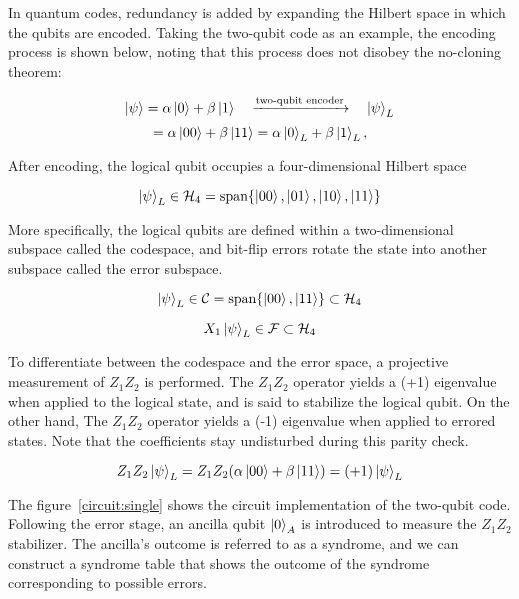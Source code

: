 In quantum codes, redundancy is added by expanding the Hilbert space in which the qubits are encoded. Taking the two-qubit code as an example, the encoding process is shown below, noting that this process does not disobey the no-cloning theorem:

\[
    \ket{\psi} = \alpha \ket{0} + \beta \ket{1}
    \quad
    \xrightarrow{\text{two-qubit encoder}}
    \quad
    \ket{\psi}_L
\]
\[
    = \alpha \ket{00} + \beta \ket{11} = \alpha \ket{0}_L + \beta \ket{1}_L,
\]

After encoding, the logical qubit occupies a four-dimensional Hilbert space

\[
    \ket{\psi}_L \in \mathcal{H}_4 = \text{span}\{\ket{00}, \ket{01}, \ket{10}, \ket{11}\}
\]

More specifically, the logical qubits are defined within a two-dimensional subspace called the codespace, and bit-flip errors rotate the state into another subspace called the error subspace.

\[
    \ket{\psi}_L \in \mathcal{C} = \text{span}\{\ket{00}, \ket{11}\} \subset \mathcal{H}_4
\]

\[
    X_1 \ket{\psi}_L \in \mathcal{F} \subset \mathcal{H}_4
\]

To differentiate between the codespace and the error space, a projective measurement of $Z_1Z_2$ is performed. The $Z_1Z_2$ operator yields a (+1) eigenvalue when applied to the logical state, and is said to stabilize the logical qubit. On the other hand, The $Z_1Z_2$ operator yields a (-1) eigenvalue when applied to errored states. Note that the coefficients stay undisturbed during this parity check.

\[
    Z_1Z_2\ket{\psi}_L = Z_1Z_2(\alpha \ket{00} + \beta \ket{11}) = (+1) \ket{\psi}_L
\]

The figure~\ref{circuit:single} shows the circuit implementation of the two-qubit code. Following the error stage, an ancilla qubit $\ket{0}_A$ is introduced to measure the $Z_1Z_2$ stabilizer. The ancilla's outcome is referred to as a syndrome, and we can construct a syndrome table that shows the outcome of the syndrome corresponding to possible errors.


